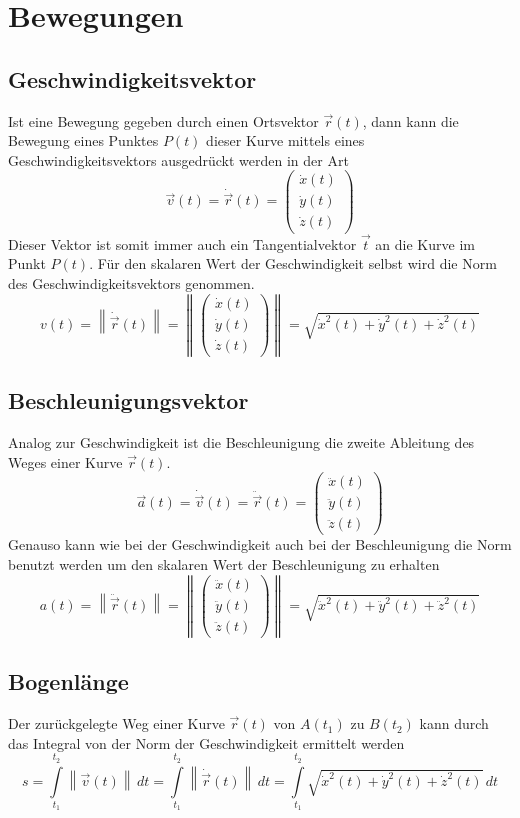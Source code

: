 \section{Bewegungen}

\subsection{Geschwindigkeitsvektor}
Ist eine Bewegung gegeben durch einen Ortsvektor $\vec{r}(t)$, dann kann 
die Bewegung eines Punktes $P(t)$ dieser Kurve mittels eines 
Geschwindigkeitsvektors ausgedrückt werden in der Art
\[ 
	\vec{v}(t) = \dot{\vec{r}}(t) 
	= \begin{pmatrix} 
		\dot{x}(t) \\ 
		\dot{y}(t) \\ 
		\dot{z}(t) 
	\end{pmatrix} 
\]
Dieser Vektor ist somit immer auch ein Tangentialvektor $\vec{t}$ an die 
Kurve im Punkt $P(t)$. Für den skalaren Wert der Geschwindigkeit selbst wird 
die Norm des Geschwindigkeitsvektors genommen.
\[  
	v(t) 
	= \left\lVert \dot{\vec{r}}(t) \right\rVert 
	= \left\lVert \begin{pmatrix} 
		\dot{x}(t) \\ 
		\dot{y}(t) \\ 
		\dot{z}(t) 
	\end{pmatrix} \right\rVert
	= \sqrt{\dot{x}^2(t) + \dot{y}^2(t) + \dot{z}^2(t)}
\]

\subsection{Beschleunigungsvektor}
Analog zur Geschwindigkeit ist die Beschleunigung die zweite Ableitung
des Weges einer Kurve $\vec{r}(t)$.
\[ 
	\vec{a}(t) 
	= \dot{\vec{v}}(t) 
	= \ddot{\vec{r}}(t) 
	= \begin{pmatrix} 
		\ddot{x}(t) \\ 
		\ddot{y}(t) \\ 
		\ddot{z}(t) 
	\end{pmatrix} 
\]
Genauso kann wie bei der Geschwindigkeit auch bei der Beschleunigung die
Norm benutzt werden um den skalaren Wert der Beschleunigung zu erhalten
\[  
	a(t) 
	= \left\lVert \ddot{\vec{r}}(t) \right\rVert 
	= \left\lVert \begin{pmatrix} 
		\ddot{x}(t) \\ 
		\ddot{y}(t) \\ 
		\ddot{z}(t) 
	\end{pmatrix} \right\rVert
	= \sqrt{\ddot{x}^2(t) + \ddot{y}^2(t) + \ddot{z}^2(t)}
\]

\subsection{Bogenlänge}
Der zurückgelegte Weg einer Kurve $\vec{r}(t)$ von $A(t_1)$ zu $B(t_2)$ kann
durch das Integral von der Norm der Geschwindigkeit ermittelt werden
\[  
	s = \int\limits_{t_1}^{t_2} \left\lVert \vec{v}(t) \right\lVert \, dt
	= \int\limits_{t_1}^{t_2} \left\lVert \dot{\vec{r}}(t) \right\lVert \, dt
	= \int\limits_{t_1}^{t_2} 
		\sqrt{\dot{x}^2(t) + \dot{y}^2(t) + \dot{z}^2(t)} \,dt
\]
